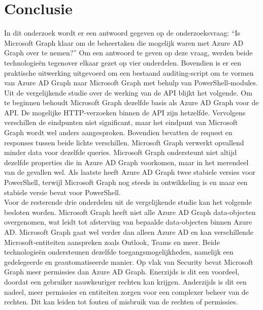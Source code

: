 
\chapter{Conclusie}%
\label{ch:conclusie}


In dit onderzoek wordt er een antwoord gegeven op de onderzoeksvraag: “Is Microsoft Graph klaar om de beheertaken die mogelijk waren met Azure AD Graph over te nemen?” Om een antwoord te geven op deze vraag, werden beide technologieën tegenover elkaar gezet op vier onderdelen. Bovendien is er een praktische uitwerking uitgevoerd om een bestaand auditing-script om te vormen van Azure \Ac{AD} Graph naar Microsoft Graph met behulp van PowerShell-modules. \\

Uit de vergelijkende studie over de werking van de \Ac{API} blijkt het volgende. Om te beginnen behoudt Microsoft Graph dezelfde basis als Azure \Ac{AD} Graph voor de \Ac{API}. De mogelijke \Ac{HTTP}-verzoeken binnen de \Ac{API} zijn hetzelfde. Vervolgens verschillen de eindpunten niet significant, maar het eindpunt van Microsoft Graph wordt wel anders aangesproken. Bovendien bevatten de request en responses tussen beide lichte verschillen. Microsoft Graph verwerkt opvallend minder data voor dezelfde queries. Microsoft Graph ondersteunt niet altijd dezelfde properties die in Azure \Ac{AD} Graph voorkomen, maar in het merendeel van de gevallen wel. Als laatste heeft Azure \Ac{AD} Graph twee stabiele versies voor PowerShell, terwijl Microsoft Graph nog steeds in ontwikkeling is en maar een stabiele versie bevat voor PowerShell. \\

Voor de resterende drie onderdelen uit de vergelijkende studie kan het volgende besloten worden. Microsoft Graph heeft niet alle Azure \Ac{AD} Graph data-objecten overgenomen, wat leidt tot afsterving van bepaalde data-objecten binnen Azure \Ac{AD}. Microsoft Graph gaat wel verder dan alleen Azure \Ac{AD} en kan verschillende Microsoft-entiteiten aanspreken zoals Outlook, Teams en meer. Beide technologieën ondersteunen dezelfde toegangsmogelijkheden, namelijk een gedelegeerde en geautomatiseerde manier. Op vlak van Security bevat Microsoft Graph meer permissies dan Azure \Ac{AD} Graph. Enerzijds is dit een voordeel, doordat een gebruiker nauwkeuriger rechten kan krijgen. Anderzijds is dit een nadeel, meer permissies en entiteiten zorgen voor een complexer beheer van de rechten. Dit kan leiden tot fouten of misbruik van de rechten of permissies. \\ 

